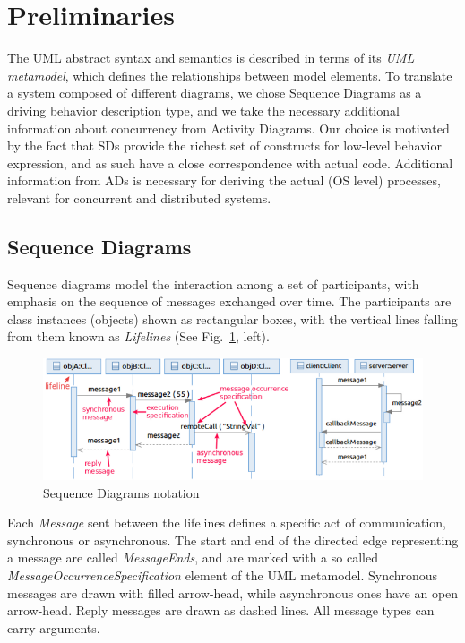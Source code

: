 \documentclass[letter]{llncs}
\newcommand{\figshrink}{\vspace{-.6cm}}
\newcommand{\figshrinkend}{}
\newcommand{\secshrinkbegin}{\vspace{-.2cm}}
\newcommand{\subsecshrink}{\vspace{-.5cm}}
\newcommand{\subsecshrinkbegin}{\vspace{-.2cm}}
\begin{document}
\section{Preliminaries}
\label{sec:Preliminaries}
\secshrinkbegin
\vspace{-6 pt}
The UML abstract syntax and semantics is described in terms of its \emph{UML metamodel},
which defines the relationships between model elements.
To translate a system composed of different diagrams, we chose Sequence 
Diagrams as a driving behavior description type, and we take the necessary additional information about concurrency
from Activity Diagrams. Our choice is motivated by the fact that SDs provide the richest set of constructs 
for low-level behavior expression, and as such have a close correspondence with actual code. 
Additional information from ADs is necessary for deriving the actual (OS level) processes,
relevant for concurrent and distributed systems. 
\subsecshrink
\subsection{Sequence Diagrams}
\label{sec:SDs}
\subsecshrinkbegin
Sequence diagrams model the interaction among a set of participants, with emphasis on the sequence of messages exchanged over time. 
The participants are class instances (objects) shown as rectangular boxes, with the vertical lines falling from them
known as \emph{Lifelines} (See Fig.~\ref{fig:example1}, left). 
\begin{figure}[!t]
\centering
\figshrink
\includegraphics[width=1.0\linewidth,keepaspectratio=true]{./Figure1_final.png}
\caption{Sequence Diagrams notation}
\label{fig:example1}
\figshrinkend
\end{figure}
Each \emph{Message} sent between the lifelines defines a specific act of communication, synchronous or asynchronous. 
The start and end of the directed edge representing a message are called \emph{MessageEnds}, and are marked with 
a so called \emph{MessageOccurrenceSpecification} element of the UML metamodel.
Synchronous messages are drawn with filled arrow-head, while asynchronous ones have an open arrow-head.
Reply messages are drawn as dashed lines. All message types can carry arguments.
\end{document}

